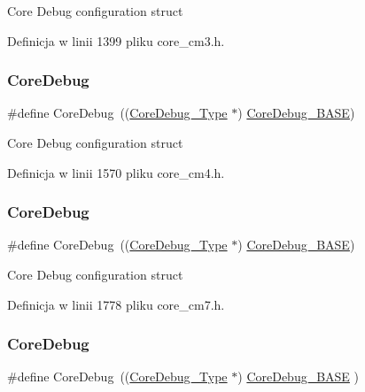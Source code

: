 Core Debug configuration struct 

Definicja w linii 1399 pliku core\+\_\+cm3.\+h.

\mbox{\label{group___c_m_s_i_s__core__base_gab6e30a2b802d9021619dbb0be7f5d63d}} 
\subsubsection{\texorpdfstring{Core\+Debug}{CoreDebug}\hspace{0.1cm}{\footnotesize\ttfamily [5/8]}}
{\footnotesize\ttfamily \#define Core\+Debug~((\hyperlink{struct_core_debug___type}{Core\+Debug\+\_\+\+Type} $\ast$)     \hyperlink{group___c_m_s_i_s__core__base_ga680604dbcda9e9b31a1639fcffe5230b}{Core\+Debug\+\_\+\+B\+A\+SE})}

Core Debug configuration struct 

Definicja w linii 1570 pliku core\+\_\+cm4.\+h.

\mbox{\label{group___c_m_s_i_s__core__base_gab6e30a2b802d9021619dbb0be7f5d63d}} 
\subsubsection{\texorpdfstring{Core\+Debug}{CoreDebug}\hspace{0.1cm}{\footnotesize\ttfamily [6/8]}}
{\footnotesize\ttfamily \#define Core\+Debug~((\hyperlink{struct_core_debug___type}{Core\+Debug\+\_\+\+Type} $\ast$)     \hyperlink{group___c_m_s_i_s__core__base_ga680604dbcda9e9b31a1639fcffe5230b}{Core\+Debug\+\_\+\+B\+A\+SE})}

Core Debug configuration struct 

Definicja w linii 1778 pliku core\+\_\+cm7.\+h.

\mbox{\label{group___c_m_s_i_s__core__base_gab6e30a2b802d9021619dbb0be7f5d63d}} 
\subsubsection{\texorpdfstring{Core\+Debug}{CoreDebug}\hspace{0.1cm}{\footnotesize\ttfamily [7/8]}}
{\footnotesize\ttfamily \#define Core\+Debug~((\hyperlink{struct_core_debug___type}{Core\+Debug\+\_\+\+Type} $\ast$)     \hyperlink{group___c_m_s_i_s__core__base_ga680604dbcda9e9b31a1639fcffe5230b}{Core\+Debug\+\_\+\+B\+A\+SE}   )}

